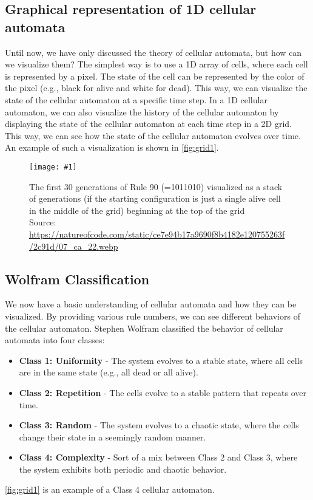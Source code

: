 \documentclass[a4paper,12pt]{llncs}
\numberwithin{equation}{section}
\newcommand{\imagewithwidth}[5]{
  \begin{figure}[htbp]%
    \begin{center}%
      \texttt{[image: \#1]}%
      \caption[#5]{#4}%
      \label{#3}%
    \end{center}%
  \end{figure}
}
\begin{document}
\subsection{Graphical representation of 1D cellular automata}
Until now, we have only discussed the theory of cellular automata, but how can we visualize them?
The simplest way is to use a 1D array of cells, where each cell is represented by a pixel.
The state of the cell can be represented by the color of the pixel (e.g., black for alive and white for dead).
This way, we can visualize the state of the cellular automaton at a specific time step.
In a 1D cellular automaton, we can also visualize the history of the cellular automaton by displaying the state of the cellular automaton at each time step in a 2D grid.
This way, we can see how the state of the cellular automaton evolves over time.
An example of such a visualization is shown in \autoref{fig:grid1}.
\imagewithwidth{figures/rule90}{\textwidth}{fig:grid1}{The first 30 generations of Rule 90 (=1011010) visualized as a stack of generations (if the starting configuration is just a single alive cell in the middle of the grid) beginning at the top of the grid\\Source: \url{https://natureofcode.com/static/ce7e94b17a9690f8b4182e120755263f/2c91d/07_ca_22.webp}}{}
\clearpage
\subsection{Wolfram Classification}
We now have a basic understanding of cellular automata and how they can be visualized.
By providing various rule numbers, we can see different behaviors of the cellular automaton.
Stephen Wolfram classified the behavior of cellular automata into four classes:
\begin{itemize}
  \item \textbf{Class 1: Uniformity} - The system evolves to a stable state, where all cells are in the same state (e.g., all dead or all alive).
  \item \textbf{Class 2: Repetition} - The cells evolve to a stable pattern that repeats over time.
  \item \textbf{Class 3: Random} - The system evolves to a chaotic state, where the cells change their state in a seemingly random manner.
  \item \textbf{Class 4: Complexity} - Sort of a mix between Class 2 and Class 3, where the system exhibits both periodic and chaotic behavior.
\end{itemize}
\autoref{fig:grid1} is an example of a Class 4 cellular automaton.
\end{document}
